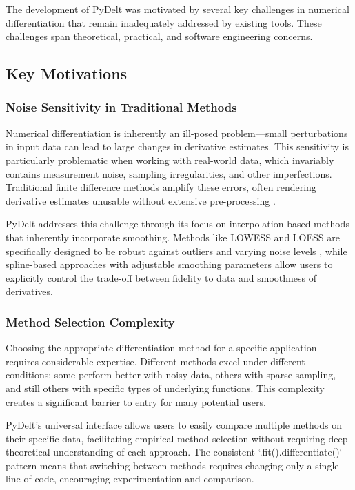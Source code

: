 \documentclass[11pt,a4paper]{article}
\begin{document}
The development of PyDelt was motivated by several key challenges in numerical differentiation that remain inadequately addressed by existing tools. These challenges span theoretical, practical, and software engineering concerns.

\subsection{Key Motivations}

\subsubsection{Noise Sensitivity in Traditional Methods}

Numerical differentiation is inherently an ill-posed problem—small perturbations in input data can lead to large changes in derivative estimates. This sensitivity is particularly problematic when working with real-world data, which invariably contains measurement noise, sampling irregularities, and other imperfections. Traditional finite difference methods amplify these errors, often rendering derivative estimates unusable without extensive pre-processing \citep{fornberg1988generation}.

PyDelt addresses this challenge through its focus on interpolation-based methods that inherently incorporate smoothing. Methods like LOWESS and LOESS are specifically designed to be robust against outliers and varying noise levels \citep{cleveland1979robust}, while spline-based approaches with adjustable smoothing parameters allow users to explicitly control the trade-off between fidelity to data and smoothness of derivatives.

\subsubsection{Method Selection Complexity}

Choosing the appropriate differentiation method for a specific application requires considerable expertise. Different methods excel under different conditions: some perform better with noisy data, others with sparse sampling, and still others with specific types of underlying functions. This complexity creates a significant barrier to entry for many potential users.

PyDelt's universal interface allows users to easily compare multiple methods on their specific data, facilitating empirical method selection without requiring deep theoretical understanding of each approach. The consistent `.fit().differentiate()` pattern means that switching between methods requires changing only a single line of code, encouraging experimentation and comparison.
\end{document}
